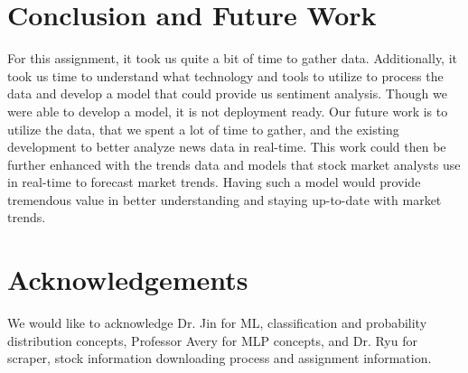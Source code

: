 \documentclass[twocolumn,12pt]{article}
\begin{document}
\begin{flushleft}
	\section{Conclusion and Future Work} \label{conclusion}

	For this assignment, it took us quite a bit of time to gather data. Additionally, it took us time to understand what technology and tools to utilize to process the data and develop a model that could provide us sentiment analysis. Though we were able to develop a model, it is not deployment ready. Our future work is to utilize the data, that we spent a lot of time to gather, and the existing development to better analyze news data in real-time. This work could then be further enhanced with the trends data and models that stock market analysts use in real-time to forecast market trends. Having such a model would provide tremendous value in better understanding and staying up-to-date with market trends.
	
	\section{Acknowledgements} \label{acknowledgements}
	We would like to acknowledge Dr. Jin \cite{rjin} for ML, classification and probability distribution concepts, Professor Avery \cite{avery} for MLP concepts, and Dr. Ryu \cite{cryu} for scraper, stock information downloading process and assignment information.




\end{flushleft}
\end{document}
